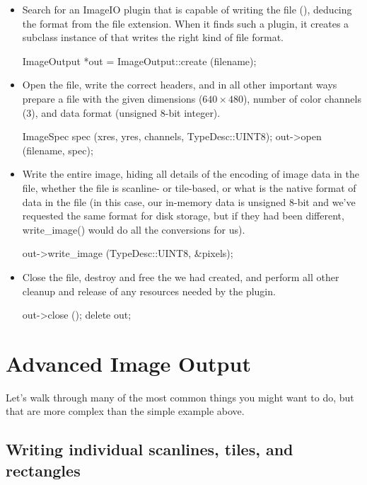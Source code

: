 \begin{itemize}
\item Search for an ImageIO plugin that is capable of writing the file
  (), deducing the format from the file extension.  When it
  finds such a plugin, it creates a subclass instance of \ImageOutput
  that writes the right kind of file format.
  \begin{code}
        ImageOutput *out = ImageOutput::create (filename);
  \end{code}
\item Open the file, write the correct headers, and in all other
  important ways prepare a file with the given dimensions ($640 \times
  480$), number of color channels (3), and data format (unsigned 8-bit
  integer).
  \begin{code}
        ImageSpec spec (xres, yres, channels, TypeDesc::UINT8);
        out->open (filename, spec);
  \end{code}
\item Write the entire image, hiding all details of the encoding of
  image data in the file, whether the file is scanline- or tile-based,
  or what is the native format of data in the file (in this case, our
  in-memory data is unsigned 8-bit and we've requested the same format
  for disk storage, but if they had been different, {\kw write_image()}
  would do all the conversions for us).
  \begin{code}
        out->write_image (TypeDesc::UINT8, &pixels);
  \end{code}
\item Close the file, destroy and free the \ImageOutput we had created,
  and perform all other cleanup and release of any resources needed by
  the plugin.
  \begin{code}
        out->close ();
        delete out;
  \end{code}
\end{itemize}



\section{Advanced Image Output}
\label{sec:imageoutput:advanced}

Let's walk through many of the most common things you might want to do,
but that are more complex than the simple example above.

\subsection{Writing individual scanlines, tiles, and rectangles}
\label{sec:imageoutput:scanlinestiles}

